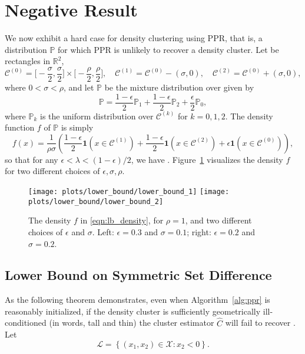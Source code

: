 \documentclass[twoside,11pt]{article}
\newcommand{\Reals}{\mathbb{R}}
\newcommand{\set}[1]{\left\{#1\right\}}
\newcommand{\1}{\mathbf{1}}
\newcommand{\mc}[1]{\mathcal{#1}}
\newcommand{\mbb}[1]{\mathbb{#1}}
\newcommand{\Pbb}{\mathbb{P}}
\newcommand{\wh}[1]{\widehat{#1}}
\begin{document}
\section{Negative Result}
\label{sec:lower_bound}
We now exhibit a hard case for density clustering using PPR, that is, a distribution $\Pbb$ for which PPR is unlikely to recover a density cluster. Let \smash{$\mc{C}^{(0)}, \mc{C}^{(1)}, \mc{C}^{(2)}$} be rectangles in $\Reals^2$,    
$$
\mc{C}^{(0)} = \biggl[-\frac{\sigma}{2}, \frac{\sigma}{2}\biggr] \times 
\biggl[-\frac{\rho}{2}, \frac{\rho}{2}\biggr], \quad 
\mc{C}^{(1)} = \mc{C}^{(0)} - (\sigma,0), \quad
\mc{C}^{(2)} = \mc{C}^{(0)} + (\sigma,0),
$$
where $0 < \sigma < \rho$, and let $\Pbb$ be the mixture distribution over \smash{$\mc{X} = \mc{C}^{(0)} \cup \mc{C}^{(1)} \cup \mc{C}^{(2)}$} given by   
$$
\Pbb = \frac{1 - \epsilon}{2} \Pbb_1 + \frac{1 - \epsilon}{2} \Pbb_2 +
\frac{\epsilon}{2} \Pbb_0, 
$$
where $\Pbb_k$ is the uniform distribution over $\mc{C}^{(k)}$ for $k = 0,1,2$.  
The density function $f$ of $\Pbb$ is simply
\begin{equation}
\label{eqn:lb_density}
f(x) = \frac{1}{\rho\sigma}\left(\frac{1 - \epsilon}{2}\1(x \in
\mc{C}^{(1)}) + \frac{1 - \epsilon}{2}\1(x \in \mc{C}^{(2)}) +
\epsilon\1(x \in \mc{C}^{(0)})  \right), 
\end{equation}
so that for any $\epsilon < \lambda < (1 - \epsilon)/2$, we have \smash{$\mbb{C}_f(\lambda) = \set{\mc{C}^{(1)}, \mc{C}^{(2)}}$}. Figure~\ref{fig:hard_case} visualizes the density $f$ for two different choices of $\epsilon, \sigma, \rho$.  

\begin{figure}[tb]
	\centering
	\texttt{[image: plots/lower\_bound/lower\_bound\_1]}
	\texttt{[image: plots/lower\_bound/lower\_bound\_2]}
	\caption{\small The density $f$ in \eqref{eqn:lb_density}, for
		$\rho=1$, and two different choices of $\epsilon$ and $\sigma$. Left:
		$\epsilon = 0.3$ and $\sigma = 0.1$; right: $\epsilon = 0.2$ and 
		$\sigma = 0.2$.} 
	\label{fig:hard_case}
\end{figure}

\subsection{Lower Bound on Symmetric Set Difference}
As the following theorem demonstrates, even when Algorithm~\ref{alg:ppr} is reasonably initialized, if the density cluster \smash{$\mc{C}^{(1)}$} is sufficiently geometrically ill-conditioned (in words, tall and thin) the cluster estimator $\wh{C}$ will fail to recover \smash{$\mc{C}^{(1)}$}. Let
\begin{equation}
\label{eqn:lower_set}
\mc{L} = \set{(x_1,x_2) \in \mc{X}: x_2 < 0}.
\end{equation}
\end{document}
